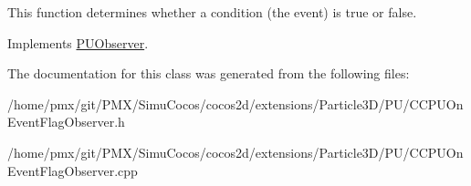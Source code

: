This function determines whether a condition (the event) is true or false. 

Implements \hyperlink{classPUObserver_a50f59cc3245e291b641463db5d3037f7}{P\+U\+Observer}.



The documentation for this class was generated from the following files\+:\begin{DoxyCompactItemize}
\item 
/home/pmx/git/\+P\+M\+X/\+Simu\+Cocos/cocos2d/extensions/\+Particle3\+D/\+P\+U/C\+C\+P\+U\+On\+Event\+Flag\+Observer.\+h\item 
/home/pmx/git/\+P\+M\+X/\+Simu\+Cocos/cocos2d/extensions/\+Particle3\+D/\+P\+U/C\+C\+P\+U\+On\+Event\+Flag\+Observer.\+cpp\end{DoxyCompactItemize}
